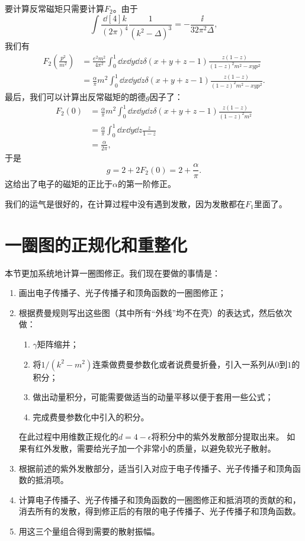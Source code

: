 要计算反常磁矩只需要计算$F_2$。由于
\[
    \int \frac{\dd[4]{k}}{(2\pi)^4} \frac{1}{(k^2 - \Delta)^3} = - \frac{\ii}{32 \pi^2 \Delta},
\]
我们有
\[
    \begin{aligned}
        F_2\left(\frac{p^2}{m^2}\right) &= \frac{e^2 m^2}{4\pi^2} \int_0^1 \dd{x} \dd{y} \dd{z} \delta(x + y + z - 1) \frac{z(1-z)}{(1-z)^2 m^2 - xy p^2} \\
        &= \frac{\alpha}{\pi} m^2 \int_0^1 \dd{x} \dd{y} \dd{z} \delta(x + y + z - 1) \frac{z(1-z)}{(1-z)^2 m^2 - xy p^2}.
    \end{aligned}
\]
最后，我们可以计算出反常磁矩的朗德$g$因子了：
\[
    \begin{aligned}
        F_2(0) &= \frac{\alpha}{\pi} m^2 \int_0^1 \dd{x} \dd{y} \dd{z} \delta(x + y + z - 1) \frac{z(1-z)}{(1-z)^2 m^2} \\
        &= \frac{\alpha}{\pi} \int_0^1 \dd{x} \dd{y} \dd{z} \frac{z}{1-z} \\
        &= \frac{\alpha}{2\pi},
    \end{aligned}
\]
于是
\begin{equation}
    g = 2 + 2 F_2(0) = 2 + \frac{\alpha}{\pi}.
\end{equation}
这给出了电子的磁矩的正比于$\alpha$的第一阶修正。

我们的运气是很好的，在计算过程中没有遇到发散，因为发散都在$F_1$里面了。

\section{一圈图的正规化和重整化}

本节更加系统地计算一圈图修正。我们现在要做的事情是：
\begin{enumerate}
    \item 画出电子传播子、光子传播子和顶角函数的一圈图修正；
    \item 根据费曼规则写出这些图（其中所有“外线”均不在壳）的表达式，然后依次做：
    \begin{enumerate}
        \item $\gamma$矩阵缩并；
        \item 将$1/(k^2 - m^2)$连乘做费曼参数化或者说费曼折叠，引入一系列从$0$到$1$的积分；
        \item 做出动量积分，可能需要做适当的动量平移以便于套用一些公式；
        \item 完成费曼参数化中引入的积分。
    \end{enumerate}
    在此过程中用维数正规化的$d = 4 - \epsilon$将积分中的紫外发散部分提取出来。
    如果有红外发散，需要给光子加一个非常小的质量，以避免软光子散射。
    \item 根据前述的紫外发散部分，适当引入对应于电子传播子、光子传播子和顶角函数的抵消项。
    \item 计算电子传播子、光子传播子和顶角函数的一圈图修正和抵消项的贡献的和，消去所有的发散，得到修正后的有限的电子传播子、光子传播子和顶角函数。
    \item 用这三个量组合得到需要的散射振幅。
\end{enumerate}

